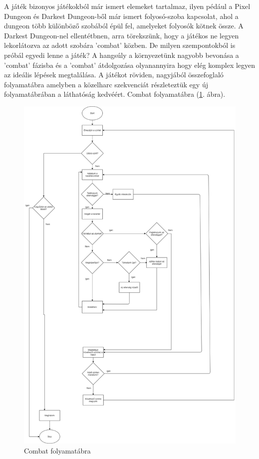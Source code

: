 

A játék bizonyos játékokból már ismert elemeket tartalmaz, ilyen pédául a Pixel Dungeon és Darkest Dungeon-ből már ismert folyosó-szoba kapcsolat, ahol a dungeon több különböző szobából épül fel, amelyeket folyosók kötnek össze. A Darkest Dungeon-nel ellentétbnen, arra törekszünk, hogy a játékos ne legyen lekorlátozva az adott szobára 'combat' közben.
De milyen szempontokból is próbál egyedi lenne a játék? A hangsúly a környezetünk nagyobb bevonása a 'combat' fázisba és a 'combat' átdolgozása olyanannyira hogy elég komplex legyen az ideális lépések megtalálása.
A játékot röviden, nagyjából összefoglaló folyamatábra amelyben a közelharc szekvenciát részleteztük egy új folyamatábrában a láthatóság kedvéért. Combat folyamatábra (\ref{fig:combat}. ábra).

\begin{figure}[h!]
	\centering
	\includegraphics[width=\textwidth]{images/image1.png}
	\caption{Combat folyamatábra}
	\label{fig:combat}
\end{figure}

